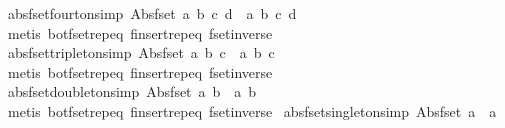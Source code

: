 \begin{isabellebody}
\endisatagproof
{\isafoldproof}%
%
\isadelimproof
\isanewline
%
\endisadelimproof
\isanewline
{}\isamarkupfalse%
\ abs{\isacharunderscore}fset{\isacharunderscore}fourton{\isacharbrackleft}simp{\isacharbrackright}{\isacharcolon}\ {\isachardoublequoteopen}Abs{\isacharunderscore}fset\ {\isacharbraceleft}a{\isacharcomma}\ b{\isacharcomma}\ c{\isacharcomma}\ d{\isacharbraceright}\ {\isacharequal}\ {\isacharbraceleft}{\isacharbar}a{\isacharcomma}\ b{\isacharcomma}\ c{\isacharcomma}\ d{\isacharbar}{\isacharbraceright}{\isachardoublequoteclose}\isanewline
%
\isadelimproof
\ \ %
\endisadelimproof
%
\isatagproof
{}\isamarkupfalse%
\ {\isacharparenleft}metis\ bot{\isacharunderscore}fset{\isachardot}rep{\isacharunderscore}eq\ finsert{\isachardot}rep{\isacharunderscore}eq\ fset{\isacharunderscore}inverse{\isacharparenright}%
\endisatagproof
{\isafoldproof}%
%
\isadelimproof
\isanewline
%
\endisadelimproof
\isanewline
{}\isamarkupfalse%
\ abs{\isacharunderscore}fset{\isacharunderscore}tripleton{\isacharbrackleft}simp{\isacharbrackright}{\isacharcolon}\ {\isachardoublequoteopen}Abs{\isacharunderscore}fset\ {\isacharbraceleft}a{\isacharcomma}\ b{\isacharcomma}\ c{\isacharbraceright}\ {\isacharequal}\ {\isacharbraceleft}{\isacharbar}a{\isacharcomma}\ b{\isacharcomma}\ c{\isacharbar}{\isacharbraceright}{\isachardoublequoteclose}\isanewline
%
\isadelimproof
\ \ %
\endisadelimproof
%
\isatagproof
{}\isamarkupfalse%
\ {\isacharparenleft}metis\ bot{\isacharunderscore}fset{\isachardot}rep{\isacharunderscore}eq\ finsert{\isachardot}rep{\isacharunderscore}eq\ fset{\isacharunderscore}inverse{\isacharparenright}%
\endisatagproof
{\isafoldproof}%
%
\isadelimproof
\isanewline
%
\endisadelimproof
\isanewline
{}\isamarkupfalse%
\ abs{\isacharunderscore}fset{\isacharunderscore}doubleton{\isacharbrackleft}simp{\isacharbrackright}{\isacharcolon}\ {\isachardoublequoteopen}Abs{\isacharunderscore}fset\ {\isacharbraceleft}a{\isacharcomma}\ b{\isacharbraceright}\ {\isacharequal}\ {\isacharbraceleft}{\isacharbar}a{\isacharcomma}\ b{\isacharbar}{\isacharbraceright}{\isachardoublequoteclose}\isanewline
%
\isadelimproof
\ \ %
\endisadelimproof
%
\isatagproof
{}\isamarkupfalse%
\ {\isacharparenleft}metis\ bot{\isacharunderscore}fset{\isachardot}rep{\isacharunderscore}eq\ finsert{\isachardot}rep{\isacharunderscore}eq\ fset{\isacharunderscore}inverse{\isacharparenright}%
\endisatagproof
{\isafoldproof}%
%
\isadelimproof
\isanewline
%
\endisadelimproof
\isanewline
{}\isamarkupfalse%
\ abs{\isacharunderscore}fset{\isacharunderscore}singleton{\isacharbrackleft}simp{\isacharbrackright}{\isacharcolon}\ {\isachardoublequoteopen}Abs{\isacharunderscore}fset\ {\isacharbraceleft}a{\isacharbraceright}\ {\isacharequal}\ {\isacharbraceleft}{\isacharbar}a{\isacharbar}{\isacharbraceright}{\isachardoublequoteclose}\isanewline

\end{isabellebody}
